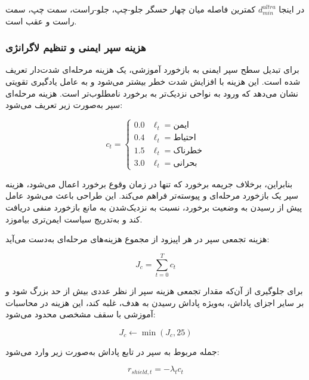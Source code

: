 در اینجا \(d_{min}^{ultra}\) کمترین فاصله میان چهار حسگر جلو-چپ، جلو-راست، سمت چپ، سمت راست و عقب است.
\subsubsection{هزینه سپر ایمنی و تنظیم لاگرانژی}
\label{subsubsec:shield_lagrangian_reward_final}

برای تبدیل سطح سپر ایمنی به بازخورد آموزشی، یک هزینه مرحله‌ای شدت‌دار تعریف شده است. این هزینه با افزایش شدت خطر بیشتر می‌شود و به عامل یادگیری تقویتی نشان می‌دهد که ورود به نواحی نزدیک‌تر به برخورد نامطلوب‌تر است. هزینه مرحله‌ای سپر به‌صورت زیر تعریف می‌شود:

\begin{equation}
	c_t =
	\begin{cases}
		0.0 & \ell_t=\text{ایمن}\\
		0.4 & \ell_t=\text{احتیاط}\\
		1.5 & \ell_t=\text{خطرناک}\\
		3.0 & \ell_t=\text{بحرانی}
	\end{cases}
	\label{eq:shield_step_cost_final}
\end{equation}

بنابراین، برخلاف جریمه برخورد که تنها در زمان وقوع برخورد اعمال می‌شود، هزینه سپر یک بازخورد مرحله‌ای و پیوسته‌تر فراهم می‌کند. این طراحی باعث می‌شود عامل پیش از رسیدن به وضعیت برخورد، نسبت به نزدیک‌شدن به مانع بازخورد منفی دریافت کند و به‌تدریج سیاست ایمن‌تری بیاموزد.

هزینه تجمعی سپر در هر اپیزود از مجموع هزینه‌های مرحله‌ای به‌دست می‌آید:

\begin{equation}
	J_c =
	\sum_{t=0}^{T} c_t
	\label{eq:shield_episode_cost_final}
\end{equation}

برای جلوگیری از آن‌که مقدار تجمعی هزینه سپر از نظر عددی بیش از حد بزرگ شود و بر سایر اجزای پاداش، به‌ویژه پاداش رسیدن به هدف، غلبه کند، این هزینه در محاسبات آموزشی با سقف مشخصی محدود می‌شود:

\begin{equation}
	J_c \leftarrow \min(J_c,25)
	\label{eq:shield_cost_cap_final}
\end{equation}

جمله مربوط به سپر در تابع پاداش به‌صورت زیر وارد می‌شود:

\begin{equation}
	r_{shield,t}
	=
	-\lambda_t c_t
	\label{eq:shield_reward_term_final}
\end{equation}

